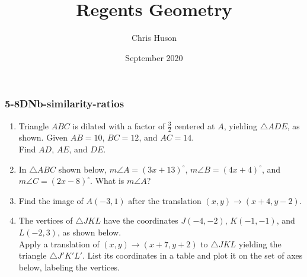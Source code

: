 \documentclass[12pt, twoside]{article}
\title{Regents Geometry}
\author{Chris Huson}
\date{September 2020}
\begin{document}
\subsubsection*{5-8DNb-similarity-ratios}
\begin{enumerate}
\item Triangle $ABC$ is dilated with a factor of $\frac{3}{2}$ centered at $A$, yielding $\triangle ADE$, as shown. Given $AB=10$, $BC=12$, and $AC=14$. \\[0.25cm] Find $AD$, $AE$, and $DE$.
    \begin{flushright}
      \end{flushright}

   \vspace{2cm}


\item In  $\triangle ABC$ shown below, $m\angle A=(3x+13)^\circ$, $m\angle B=(4x+4)^\circ$, and $m\angle C=(2x-8)^\circ$. What is $m\angle A$?
   \begin{flushright}
     \end{flushright}

   \newpage
\item Find the image of $A(-3,1)$ after the translation $(x,y) \rightarrow (x+4,y-2)$.
   \vspace{2cm}

\item The vertices of $\triangle JKL$ have the coordinates $J(-4,-2)$, $K(-1,-1)$, and $L(-2,3)$, as shown below. \\[0.25cm]
    Apply a translation of $(x,y) \rightarrow (x+7, y+2)$ to $\triangle JKL$  yielding the triangle $\triangle J'K'L'$. List its coordinates in a table and plot it on the set of axes below, labeling the vertices.
    \begin{flushright}
\end{flushright}
\end{enumerate}
\end{document}
